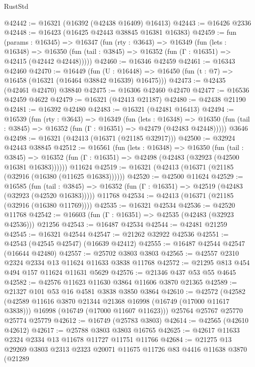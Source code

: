 \begin{lexlean}{RustStd}
\begin{coremodule}
@42442 := @16321 (@16392 (@42438 @16409) @16413)
@42443 := @16426 @2336
@42448 := @16423 (@16425 @42443 @38845 @16381 @16383)
@42459 := fun (params : @16345) =>
  @16347
    (fun (rty : @3643) =>
    @16349
      (fun (lets : @16348) =>
      @16350 (fun (tail : @3845) => @16352 (fun (Γ : @16351) => @42415 (@42442 @42448)))))
@42460 := @16346 @42459
@42461 := @16343 @42460
@42470 := @16449
    (fun (U : @16448) => @16450 (fun (t : @7) => @16458 (@16321 (@16464 @38842 @16339) @16475)))
@42473 := @42435 (@42461 @42470) @38840
@42475 := @16306 @42460 @42470
@42477 := @16536 @42459 @4622
@42479 := @16321 (@42413 @21187)
@42480 := @42438 @21190
@42481 := @16392 @42480
@42483 := @16321 (@42481 @16413)
@42494 := @16539
    (fun (rty : @3643) =>
    @16349
      (fun (lets : @16348) =>
      @16350 (fun (tail : @3845) => @16352 (fun (Γ : @16351) => @42479 (@42483 @42448)))))
    @3646
@42498 := @16321 (@42413 (@16371 (@21185 @32917)))
@42500 := @32924 @42443 @38845
@42512 := @16561
    (fun (lets : @16348) =>
    @16350
      (fun (tail : @3845) =>
      @16352 (fun (Γ : @16351) => @42498 (@42483 (@32923 (@42500 @16381 @16383))))))
    @11624
@42519 := @16321 (@42413 (@16371 (@21185 (@32916 (@16380 (@11625 @16383))))))
@42520 := @42500 @11624
@42529 := @16585
    (fun (tail : @3845) => @16352 (fun (Γ : @16351) => @42519 (@42483 (@32923 (@42520 @16383)))))
    @11768
@42534 := @42413 (@16371 (@21185 (@32916 (@16380 @11769))))
@42535 := @16321 @42534
@42536 := @42520 @11768
@42542 := @16603 (fun (Γ : @16351) => @42535 (@42483 (@32923 @42536))) @21256
@42543 := @16487 @42534
@42544 := @42481 @21259
@42545 := @16321 @42544
@42547 := @21262 @32922 @42536
@42551 := @42543 (@42545 @42547) (@16639 @42412)
@42555 := @16487 @42544 @42547 (@16644 @42480)
@42557 := @25702 @3803 @3803
@42565 := @42557 @2310 @2324 @2334 @13 @11624 @11633 @3838 @11768
@42572 := @21295 @813 @454 @494 @157 @11624 @11631 @5629
@42576 := @21346 @437 @53 @55 @4645
@42582 := @42576 @11623 @11630 @3864 @11606 @3870 @21365
@42589 := @21327 @101 @53 @16 @4581 @3838 @3850 @3864
@42610 := @42572
    (@42582
      (@42589 @11616 @3870 @21344 @21368 @16998 (@16749 (@17000 @11617 @3838)))
      @16998
      (@16749 (@17000 @11607 @11623)))
    @25764
    @25767
    @25770
    @25774
    @25779
@42612 := @16749 (@25783 @3803)
@42614 := @42565 (@42610 @42612)
@42617 := @25788 @3803 @3803 @16765
@42625 := @42617 @11633 @2324 @2334 @13 @11678 @11727 @11751 @11766
@42684 := @21275
    @13
    @29269
    @3803
    @2313
    @2323
    @20071
    @11675
    @11726
    @83
    @4416
    @11638
    @3870
    (@21289

\end{coremodule}
\end{lexlean}
